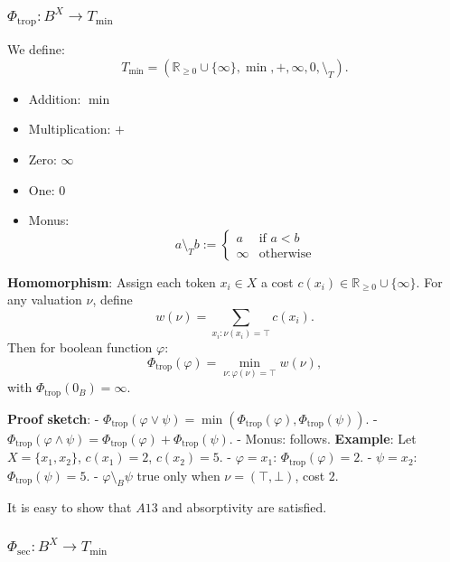 \subsubsection{$\Phi_{\mathrm{trop}}: B^X \to T_{\min}$}

We define:
$$
T_{\min} = (\mathbb{R}_{\ge 0} \cup \{\infty\},\min,+,\infty,0,\setminus_T).
$$
\begin{itemize}
    \item Addition: \(\min\)
    \item Multiplication: \(+\)
    \item Zero: \(\infty\)
    \item One: \(0\)
    \item Monus:
    \[
    a \setminus_T b :=
    \begin{cases}
        a & \text{if } a < b \\
        \infty & \text{otherwise}
    \end{cases}
    \]
\end{itemize}



\textbf{Homomorphism}:\newline
Assign each token \(x_i\in X\) a cost \(c(x_i)\in\mathbb{R}_{\ge0}\cup\{\infty\}\). For any valuation \(\nu\), define
$$
w(\nu) = \sum_{x_i:\nu(x_i)=\top} c(x_i).
$$
Then for boolean function  \(\varphi\):
$$
\Phi_{\mathrm{trop}}(\varphi) 
= \min_{\nu:\varphi(\nu)=\top} w(\nu),
$$
with \(\Phi_{\mathrm{trop}}(0_B)=\infty\).
\newline

\textbf{Proof sketch}: \newline
- \(\Phi_{\mathrm{trop}}(\varphi \vee \psi) = \min(\Phi_{\mathrm{trop}}(\varphi), \Phi_{\mathrm{trop}}(\psi))\).  
- \(\Phi_{\mathrm{trop}}(\varphi \wedge \psi) = \Phi_{\mathrm{trop}}(\varphi) + \Phi_{\mathrm{trop}}(\psi)\).  
- Monus: follows. \newline
\textbf{Example}: \newline
Let \(X=\{x_1,x_2\}\), \(c(x_1)=2\), \(c(x_2)=5\).  
- \(\varphi = x_1\): \(\Phi_{\mathrm{trop}}(\varphi)=2\).  
- \(\psi = x_2\): \(\Phi_{\mathrm{trop}}(\psi)=5\).  
- \(\varphi \setminus_B \psi\) true only when \(\nu=(\top,\bot)\), cost \(2\).

It is easy to show that $A13$ and absorptivity are satisfied.


\subsubsection{$\Phi_{\mathrm{sec}}: B^X \to T_{\min}$}

